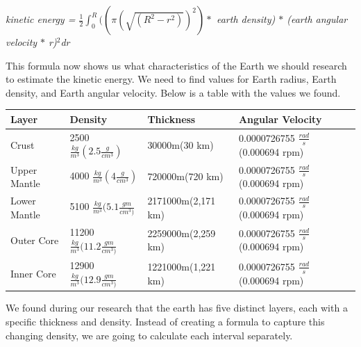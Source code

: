 \documentclass[a4paper, 11pt, oneside]{book} %
\begin{document}
\textit{kinetic energy = $\frac{1}{2} \int_{0}^{R}((\pi(\sqrt{(R^2-r^2)})^2) *$ earth density) $*$ (earth angular velocity $*$ r)$^2$dr}\\

\vspace{0.5\baselineskip} %

This formula now shows us what characteristics of the Earth we should research to estimate the kinetic energy. We need to find values for Earth radius, Earth density, and Earth angular velocity. Below is a table with the values we found.\\

\begin{table}[!h]
\centering
\begin{tabular}{|l|l|l|l|}
\hline
Layer        & Density                    & Thickness          & Angular Velocity                 \\ \hline
Crust        & 2500 $\frac{kg}{m^3} (2.5 \frac{g}{cm^3})$    & 30000m(30 km)      & 0.0000726755 $\frac{rad}{s}$ (0.000694 rpm) \\ \hline
Upper Mantle & 4000 $\frac{kg}{m^3} (4 \frac{g}{cm^3})$      & 720000m(720 km)    & 0.0000726755 $\frac{rad}{s}$ (0.000694 rpm) \\ \hline
Lower Mantle & 5100 $\frac{kg}{m^3} (5.1 \frac{gm}{cm^3)}$   & 2171000m(2,171 km) & 0.0000726755 $\frac{rad}{s}$ (0.000694 rpm) \\ \hline
Outer Core   & 11200 $\frac{kg}{m^3} (11.2 \frac{gm}{cm^3)}$ & 2259000m(2,259 km) & 0.0000726755 $\frac{rad}{s}$ (0.000694 rpm) \\ \hline
Inner Core   & 12900 $\frac{kg}{m^3} (12.9 \frac{gm}{cm^3)}$ & 1221000m(1,221 km) & 0.0000726755 $\frac{rad}{s}$ (0.000694 rpm) \\ \hline
\end{tabular}
\end{table}

\vspace{0.5\baselineskip} %
\vspace{0.5\baselineskip} %

We found during our research that the earth has five distinct layers, each with a specific thickness and density. Instead of creating a formula to capture this changing density, we are going to calculate each interval separately.\\

\vspace{0.5\baselineskip} %
\vspace{0.5\baselineskip} %
\end{document}

